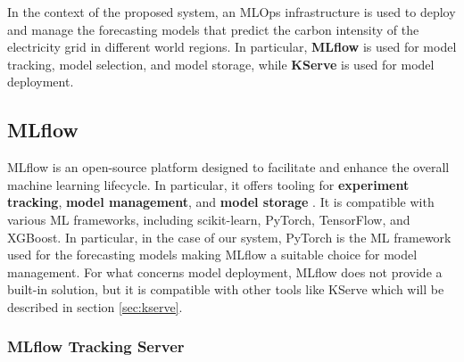 In the context of the proposed system, an MLOps infrastructure is used to deploy and manage the forecasting models that predict the carbon intensity of the electricity grid in different world regions.
In particular, \textbf{MLflow} is used for model tracking, model selection, and model storage, while \textbf{KServe} is used for model deployment.

\subsection{MLflow}

MLflow is an open-source platform designed to facilitate and enhance the overall machine learning lifecycle. 
In particular, it offers tooling for \textbf{experiment tracking}, \textbf{model management}, and \textbf{model storage} \cite{mlflow_docs}.
It is compatible with various ML frameworks, including scikit-learn, PyTorch, TensorFlow, and XGBoost.
In particular, in the case of our system, PyTorch is the ML framework used for the forecasting models making MLflow a suitable choice for model management.
For what concerns model deployment, MLflow does not provide a built-in solution, but it is compatible with other tools like KServe which will be described in section \ref{sec:kserve}.

\subsubsection{MLflow Tracking Server}
\label{sec:mlflow_tracking_server}

